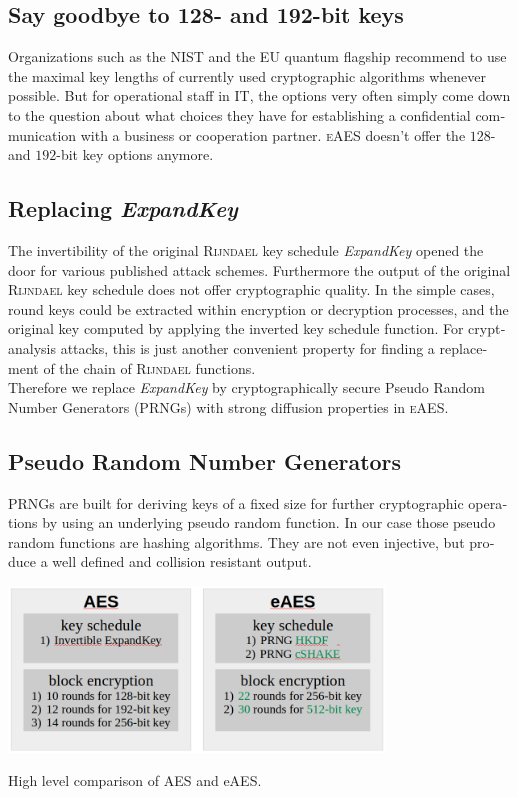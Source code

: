 \documentclass[a4paper,11pt]{article}
\begin{document}
\begin{otherlanguage}{english}
\subsection{Say goodbye to 128- and 192-bit keys}
\noindent
Organizations such as the NIST and the EU quantum flagship \cite{KPN} recommend to use the maximal key lengths of currently used cryptographic algorithms whenever possible. But for operational staff in IT, the options very often simply come down to the question about what choices they have for establishing a confidential communication with a business or cooperation partner. \textsc{eAES} doesn't offer the $128$- and $192$-bit key options anymore.

\subsection{Replacing \textit{ExpandKey}}
\noindent
The invertibility of the original \textsc{Rijndael} key schedule \textit{ExpandKey} opened the door for various published attack schemes. Furthermore the output of the original \textsc{Rijndael} key schedule does not offer cryptographic quality. In the simple cases, round keys could be extracted within encryption or decryption processes, and the original key computed by applying the inverted key schedule function. For cryptanalysis attacks, this is just another convenient property for finding a replacement of the chain of \textsc{Rijndael} functions. \\
Therefore we replace \textit{ExpandKey} by cryptographically secure Pseudo Random Number Generators (PRNGs) with strong diffusion properties in \textsc{eAES}. 

\subsection{Pseudo Random Number Generators}
\noindent
PRNGs are built for deriving keys of a fixed size for further cryptographic operations by using an underlying pseudo random function. In our case those pseudo random functions are hashing algorithms. They are not even injective, but produce a well defined and collision resistant output. 

\begin{figurehere}
  \centering
  \includegraphics[width=10cm]{comparison.png}
  \caption{High level comparison of AES and eAES.\label{abb_2}}
\end{figurehere}
\vspace{0.3cm}


\end{otherlanguage}
\end{document}
